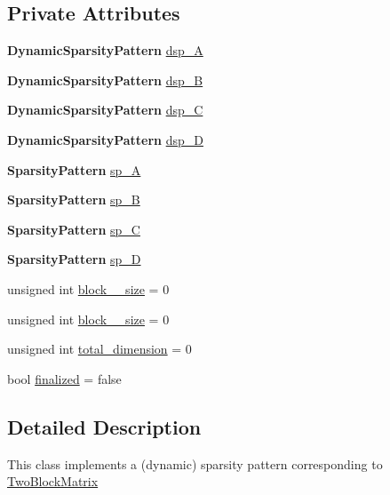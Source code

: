 \subsection*{Private Attributes}
\begin{DoxyCompactItemize}
\item 
{\bf Dynamic\+Sparsity\+Pattern} \hyperlink{class_two_block_sparsity_pattern_ac3bafc713fec0ec2232fc084f880c50c}{dsp\+\_\+A}
\item 
{\bf Dynamic\+Sparsity\+Pattern} \hyperlink{class_two_block_sparsity_pattern_ab1b2d6dc5d92f6353b80dd7a8d32ffa4}{dsp\+\_\+B}
\item 
{\bf Dynamic\+Sparsity\+Pattern} \hyperlink{class_two_block_sparsity_pattern_a444a6465b3ba1355fb675128c6e9800a}{dsp\+\_\+C}
\item 
{\bf Dynamic\+Sparsity\+Pattern} \hyperlink{class_two_block_sparsity_pattern_a853d4000754f009a66853954d8c540bf}{dsp\+\_\+D}
\item 
{\bf Sparsity\+Pattern} \hyperlink{class_two_block_sparsity_pattern_ad09712fc57a8cf5a2cd2cb9fc238a7cc}{sp\+\_\+A}
\item 
{\bf Sparsity\+Pattern} \hyperlink{class_two_block_sparsity_pattern_a95e817472f023d7237c752a18a24ac73}{sp\+\_\+B}
\item 
{\bf Sparsity\+Pattern} \hyperlink{class_two_block_sparsity_pattern_aee8da566a426045fb8101dba91295a27}{sp\+\_\+C}
\item 
{\bf Sparsity\+Pattern} \hyperlink{class_two_block_sparsity_pattern_a7a820cba98001e45ba09551a306b14d7}{sp\+\_\+D}
\item 
unsigned int \hyperlink{class_two_block_sparsity_pattern_a81789900ac1a9f5bfd7f85ad730eb03b}{block\+\_\+\_\+size} = 0
\item 
unsigned int \hyperlink{class_two_block_sparsity_pattern_ab215e3553e07b5f5872b1e01228968f2}{block\+\_\+\_\+size} = 0
\item 
unsigned int \hyperlink{class_two_block_sparsity_pattern_aa560457e8b8bf7a06acf6b19987c5ee0}{total\+\_\+dimension} = 0
\item 
bool \hyperlink{class_two_block_sparsity_pattern_a7c930cd0dd5e1d6fb1550d6c3939c7aa}{finalized} = false
\end{DoxyCompactItemize}


\subsection{Detailed Description}
This class implements a (dynamic) sparsity pattern corresponding to \hyperlink{class_two_block_matrix}{Two\+Block\+Matrix} 


